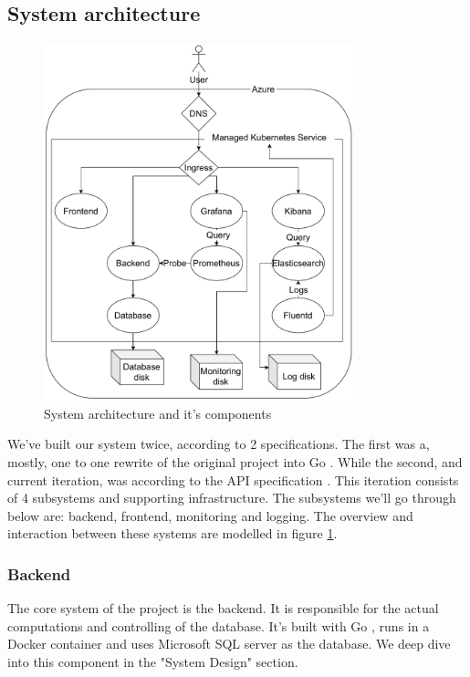 \subsection{System architecture}
\begin{figure}[h]
    \centering
    \includegraphics[width=0.8\textwidth]{images/infrastructure.pdf}
    \caption{System architecture and it's components}
    \label{fig:architecture}
\end{figure}

We've built our system twice, according to 2 specifications. The first was a, mostly, one to one rewrite of the original project into Go \cite{tool:go}.
While the second, and current iteration, was according to the API specification \cite{spec:api}. 
This iteration consists of 4 subsystems and supporting infrastructure. The subsystems we'll go through below are: backend, frontend, monitoring and logging.
The overview and interaction between these systems are modelled in figure \ref{fig:architecture}.

\subsubsection{Backend}
The core system of the project is the backend. It is responsible for the actual computations and controlling of the database.
It's built with Go \cite{tool:go}, runs in a Docker container and uses Microsoft SQL server \cite{tool:microsoft-sql-server} as the database. We deep dive into this component in the "System Design" section. %

